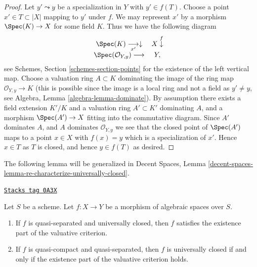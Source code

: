 \begin{proof}
\medskip\noindent
Let $y' \leadsto y$ be a specialization in $Y$ with $y' \in f(T)$.
Choose a point $x' \in T \subset |X|$ mapping to $y'$ under $f$.
We may represent $x'$ by a morphism $\Spec(K) \to X$
for some field $K$. Thus we have the following diagram
$$
\begin{array}{cc}\Spec(K) \underset{x'}{\longrightarrow}\downarrow & X \overset{f}{\downarrow} \\ \Spec(\mathcal{O}_{Y, y}) \longrightarrow & Y,\end{array}
$$
see
Schemes, Section \ref{schemes-section-points}
for the existence of the left vertical map.
Choose a valuation ring $A \subset K$ dominating the image of
the ring map $\mathcal{O}_{Y, y} \to K$ (this is possible since
the image is a local ring and not a field as $y' \not = y$, see
Algebra, Lemma \ref{algebra-lemma-dominate}).
By assumption there exists a field extension $K'/K$ and a
valuation ring $A' \subset K'$ dominating $A$, and a morphism
$\Spec(A') \to X$ fitting into the commutative diagram.
Since $A'$ dominates $A$, and $A$ dominates $\mathcal{O}_{Y, y}$
we see that the closed point of $\Spec(A')$ maps to
a point $x \in X$ with $f(x) = y$ which is a specialization of $x'$.
Hence $x \in T$ as $T$ is closed, and hence $y \in f(T)$ as desired.
\end{proof}

The following lemma will be generalized in Decent Spaces, Lemma
\ref{decent-spaces-lemma-re-characterize-universally-closed}.

\begin{lemma}
\label{spaces-morphisms-lemma-characterize-universally-closed-quasi-separated}
\href{https://stacks.math.columbia.edu/tag/0A3X}{\texttt{Stacks tag 0A3X}}

Let $S$ be a scheme. Let $f : X \to Y$ be a
morphism of algebraic spaces over $S$.
\begin{enumerate}
\item If $f$ is quasi-separated and universally closed, then
$f$ satisfies the existence part of the valuative criterion.
\item If $f$ is quasi-compact and quasi-separated, then
$f$ is universally closed if and only if the existence part of the
valuative criterion holds.
\end{enumerate}
\end{lemma}

